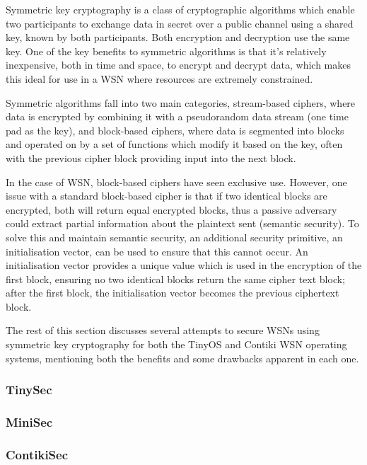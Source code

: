 \documentclass{mprop}
\begin{document}
Symmetric key cryptography is a class of cryptographic algorithms which enable two participants to exchange data in secret over a public channel using a shared key, known by both participants. Both encryption and decryption use the same key. One of the key benefits to symmetric algorithms is that it's relatively inexpensive, both in time and space, to encrypt and decrypt data, which makes this ideal for use in a WSN where resources are extremely constrained.

Symmetric algorithms fall into two main categories, stream-based ciphers, where data is encrypted by combining it with a pseudorandom data stream (one time pad as the key), and block-based ciphers, where data is segmented into blocks and operated on by a set of functions which modify it based on the key, often with the previous cipher block providing input into the next block. 

In the case of WSN, block-based ciphers have seen exclusive use. However, one issue with a standard block-based cipher is that if two identical blocks are encrypted, both will return equal encrypted blocks, thus a passive adversary could extract partial information about the plaintext sent (semantic security). To solve this and maintain semantic security, an additional security primitive, an initialisation vector, can be used to ensure that this cannot occur. An initialisation vector provides a unique value which is used in the encryption of the first block, ensuring no two identical blocks return the same cipher text block; after the first block, the initialisation vector becomes the previous ciphertext block.

The rest of this section discusses several attempts to secure WSNs using symmetric key cryptography for both the TinyOS and Contiki WSN operating systems, mentioning both the benefits and some drawbacks apparent in each one. 


\subsubsection{TinySec} %
\label{ssub:tinysec}


\subsubsection{MiniSec} %
\label{ssub:minisec}


\subsubsection{ContikiSec} %
\label{ssub:contikisec}

\end{document}
